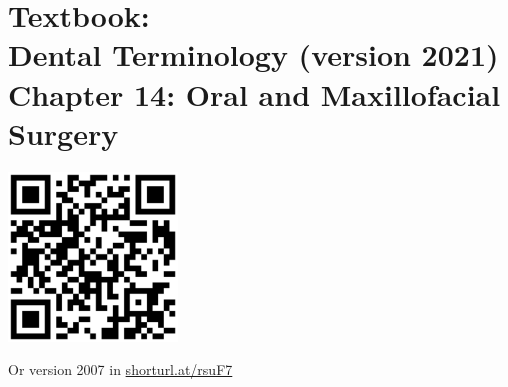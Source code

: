\documentclass[
paper=landscape,
paper=160mm:90mm, %
fontsize=11pt, %
pagesize, %
parskip=half-, %
]{scrartcl} %
\theoremstyle{mythmstyle} %
\begin{document}




\clearpage





\section*{Textbook: \\
Dental Terminology (version 2021)\\
Chapter 14: Oral and Maxillofacial Surgery}
\thispagestyle{headings} %
%
%

\begin{center}
    

\includegraphics[width=4.5cm]{qrcode_15880804_DentalTerminologyAmazon.png}
\end{center}
Or version 2007 in \url{shorturl.at/rsuF7}

\clearpage


\thispagestyle{empty} %
\end{document}

